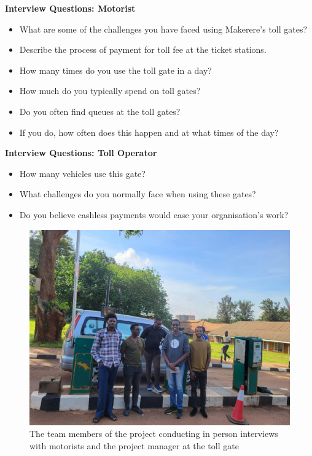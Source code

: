 \clearpage


\begin{appendices}
    \textbf{Interview Questions: Motorist}
    \begin{itemize}
        \item What are some of the challenges you have faced using Makerere's toll gates?
        \item Describe the process of payment for toll fee at the ticket stations.
        \item How many times do you use the toll gate in a day?
        \item How much do you typically spend on toll gates?
        \item Do you often find queues at the toll gates?
        \item If you do, how often does this happen and at what times of the day?
    \end{itemize}

    \textbf{Interview Questions: Toll Operator}
    \begin{itemize}
        \item How many vehicles use this gate?
        \item What challenges do you normally face when using these gates?
        \item Do you believe cashless payments would ease your organisation's work?
    \end{itemize}


    \begin{figure}
        \begin{center}
            \includegraphics[scale = 0.3]{images/rizz.jpeg}
            \caption{The team members of the project conducting in person interviews with motorists and the project manager at the toll gate}
        \end{center}
    \end{figure}
\end{appendices}
